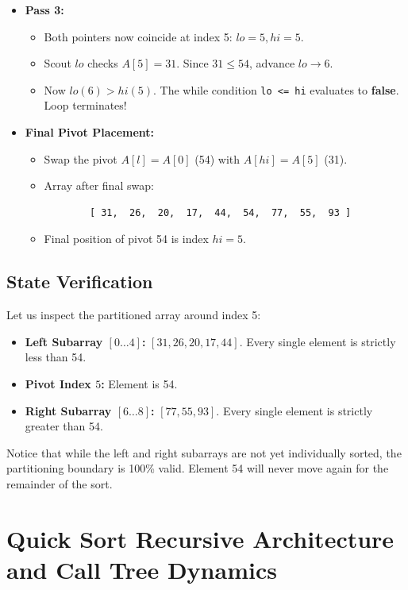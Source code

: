 \documentclass[10pt,journal,compsoc,onecolumn]{IEEEtran}
\begin{document}
\begin{itemize}
    \item \textbf{Pass 3:}
    \begin{itemize}
        \item Both pointers now coincide at index 5: $lo = 5, hi = 5$.
        \item Scout $lo$ checks $A[5] = 31$. Since $31 \le 54$, advance $lo \to 6$.
        \item Now $lo (6) > hi (5)$. The while condition \verb|lo <= hi| evaluates to \textbf{false}. Loop terminates!
    \end{itemize}

    \item \textbf{Final Pivot Placement:}
    \begin{itemize}
        \item Swap the pivot $A[l] = A[0]$ (54) with $A[hi] = A[5]$ (31).
        \item Array after final swap:
        \begin{verbatim}
        [ 31,  26,  20,  17,  44,  54,  77,  55,  93 ]
        \end{verbatim}
        \item Final position of pivot 54 is index $hi = 5$.
    \end{itemize}
\end{itemize}

\subsection{State Verification}

Let us inspect the partitioned array around index 5:
\begin{itemize}
    \item \textbf{Left Subarray $[0 \dots 4]$:} $[31, 26, 20, 17, 44]$. Every single element is strictly less than 54.
    \item \textbf{Pivot Index $5$:} Element is 54.
    \item \textbf{Right Subarray $[6 \dots 8]$:} $[77, 55, 93]$. Every single element is strictly greater than 54.
\end{itemize}
Notice that while the left and right subarrays are not yet individually sorted, the partitioning boundary is 100\% valid. Element 54 will never move again for the remainder of the sort.

\section{Quick Sort Recursive Architecture and Call Tree Dynamics}
\label{sec:quicksort}
\end{document}
